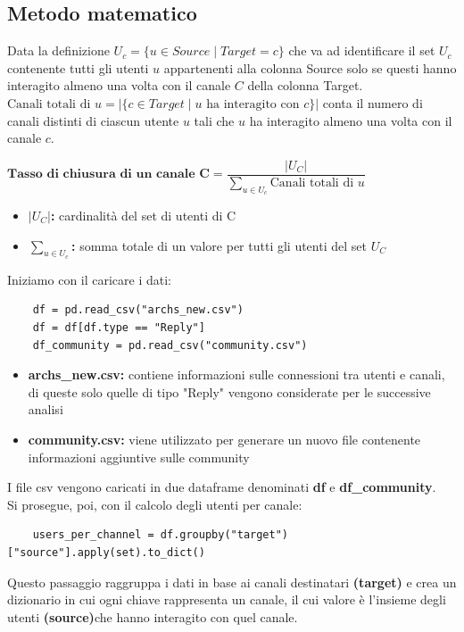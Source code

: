 \documentclass[12pt]{article}
\begin{document}
	\subsection{Metodo matematico}
	Data la definizione \textbf{\textbf{$U_{c} = \{u \in Source \mid Target = c\}$}} che va ad identificare il set $U_{c}$ contenente tutti gli utenti $u$ appartenenti alla colonna Source solo se questi hanno interagito almeno una volta con il canale $C$ della colonna Target.
	\\
	$\text{Canali totali di } u = |\{c \in Target \mid u \text{ ha interagito con } c\}|$ conta il numero di canali distinti di ciascun utente $u$ tali che $u$ ha interagito almeno una volta con il canale $c$.
	\\
	\begin{center}
		$\textbf{Tasso di chiusura di un canale C} = \dfrac{|U_{C}|}{\sum_{u \in U_{c}}  \text{Canali totali di } u}$
	\end{center}
	\begin{itemize}[label=]
		\item \textbf{$|U_{C}|$:} cardinalità del set di utenti di C
		\item \textbf{$\sum_{u \in U_{c}}$:} somma totale di un valore per tutti gli utenti del set $U_{C}$
	\end{itemize}
	Iniziamo con il caricare i dati:
	\begin{lstlisting}
	df = pd.read_csv("archs_new.csv")
	df = df[df.type == "Reply"]
	df_community = pd.read_csv("community.csv")
	\end{lstlisting}
	\begin{itemize}[label=]
		\item \textbf{archs\_new.csv:} contiene informazioni sulle connessioni tra utenti e canali, di queste solo quelle di tipo "Reply" vengono considerate per le successive analisi
		\item \textbf{community.csv:} viene utilizzato per generare un nuovo file contenente informazioni aggiuntive sulle community
	\end{itemize}
	I file csv vengono caricati in due dataframe denominati \textbf{df} e \textbf{df\_community}.\\
	Si prosegue, poi, con il calcolo degli utenti per canale:
	\begin{lstlisting}
	users_per_channel = df.groupby("target")["source"].apply(set).to_dict()
	\end{lstlisting}
	Questo passaggio raggruppa i dati in base ai canali destinatari \textbf{(target)} e crea un dizionario in cui ogni chiave rappresenta un canale, il cui valore è l'insieme degli utenti \textbf{(source)}che hanno interagito con quel canale.\\
\end{document}
